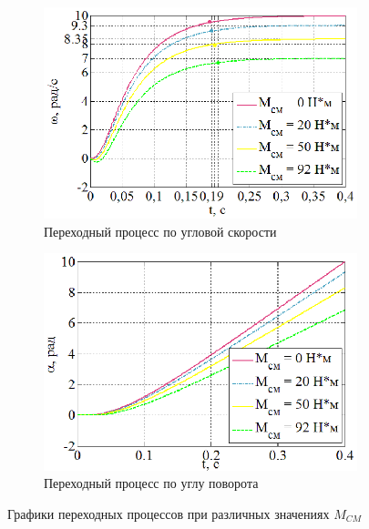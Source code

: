 \documentclass[a4paper,12pt]{article} %
\begin{document}
\begin{figure}[H]
	\begin{subfigure}[b]{0.48\textwidth}
		\includegraphics[width = \textwidth]{scheme/W1}
		\caption{Переходный процесс по угловой скорости}
	\end{subfigure}
	\hfill
	\begin{subfigure}[b]{0.48\textwidth}
		\includegraphics[width = \textwidth]{scheme/A1}
		\caption{Переходный процесс по углу поворота}
	\end{subfigure}
	\caption{Графики переходных процессов при различных значениях $M_{CM}$}
	\label{UIwa1}
\end{figure}

\newpage
\end{document}
